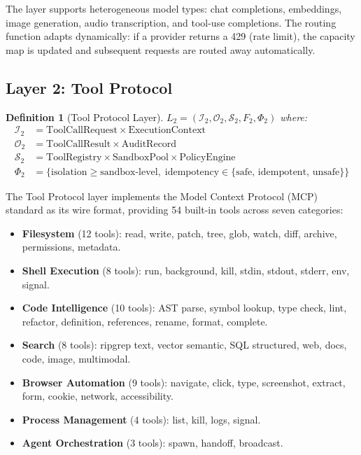 \documentclass[11pt]{article}
\newtheorem{definition}{Definition}
\begin{document}
The layer supports heterogeneous model types: chat completions, embeddings,
image generation, audio transcription, and tool-use completions. The routing
function adapts dynamically: if a provider returns a 429 (rate limit), the
capacity map is updated and subsequent requests are routed away automatically.

\subsection{Layer 2: Tool Protocol}

\begin{definition}[Tool Protocol Layer]
    $L_2 = \left(\mathcal{I}_2, \mathcal{O}_2, \mathcal{S}_2, F_2, \Phi_2\right)$ where:
    \begin{align*}
        \mathcal{I}_2 &= \text{ToolCallRequest} \times \text{ExecutionContext} \\
        \mathcal{O}_2 &= \text{ToolCallResult} \times \text{AuditRecord} \\
        \mathcal{S}_2 &= \text{ToolRegistry} \times \text{SandboxPool} \times
                         \text{PolicyEngine} \\
        \Phi_2 &= \{\text{isolation} \geq \text{sandbox-level},\;
                    \text{idempotency} \in \{\text{safe, idempotent, unsafe}\}\}
    \end{align*}
\end{definition}

The Tool Protocol layer implements the Model Context Protocol (MCP) standard
as its wire format, providing 54 built-in tools across seven categories:

\begin{itemize}[leftmargin=1.5em]
    \item \textbf{Filesystem} (12 tools): read, write, patch, tree, glob,
          watch, diff, archive, permissions, metadata.
    \item \textbf{Shell Execution} (8 tools): run, background, kill, stdin,
          stdout, stderr, env, signal.
    \item \textbf{Code Intelligence} (10 tools): AST parse, symbol lookup,
          type check, lint, refactor, definition, references, rename, format, complete.
    \item \textbf{Search} (8 tools): ripgrep text, vector semantic, SQL
          structured, web, docs, code, image, multimodal.
    \item \textbf{Browser Automation} (9 tools): navigate, click, type,
          screenshot, extract, form, cookie, network, accessibility.
    \item \textbf{Process Management} (4 tools): list, kill, logs, signal.
    \item \textbf{Agent Orchestration} (3 tools): spawn, handoff, broadcast.
\end{itemize}
\end{document}
